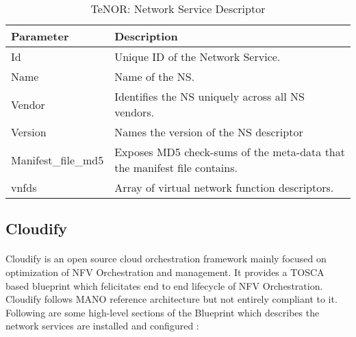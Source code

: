     \begin{table}[h]
        \centering
    \begin{tabular}{ |p{4cm}|p{10cm}|}
        \hline
        \textbf{Parameter} & \textbf{Description} \\
        \hline
         
         Id	& Unique ID of the Network Service. \\
         \hline
         Name &	Name of the NS. \\
         \hline
         Vendor	& Identifies the NS uniquely across all NS vendors. \\
         \hline
         Version &	Names the version of the NS descriptor \\
         \hline
         Manifest\_file\_md5 & Exposes MD5 check-sums of the meta-data that the manifest file contains. \\
         \hline
         vnfds & Array of virtual network function descriptors. \\
         \hline
    \end{tabular}
        \caption{TeNOR: Network Service Descriptor}
    \label{tab:TeNOR_NSD_section}
 \end{table}

\subsection{Cloudify}
\paragraph{}
Cloudify is an open source cloud orchestration framework mainly focused on optimization of NFV Orchestration and management. It provides a TOSCA based blueprint which felicitates end to end lifecycle of NFV Orchestration. Cloudify follows MANO reference architecture but not entirely compliant to it\cite{de2018network}. Following are some high-level sections of the Blueprint which describes the network services are installed and configured \cite{CloudifySchemaDocumentation}:


